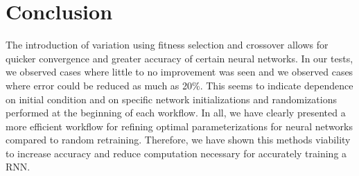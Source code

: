 \section{Conclusion}
\label{sec:conclusion}

The introduction of variation using fitness selection and crossover allows for quicker convergence and greater accuracy of certain neural networks. In our tests, we observed cases where little to no improvement was seen and we observed cases where error could be reduced  as much as 20\%. This seems to indicate dependence on initial condition and on specific network initializations and randomizations performed at the beginning of each workflow. In all, we have clearly presented a more efficient workflow for refining optimal parameterizations for neural networks compared to random retraining. Therefore, we have shown this methods viability to increase accuracy and reduce computation necessary for accurately training a RNN.

